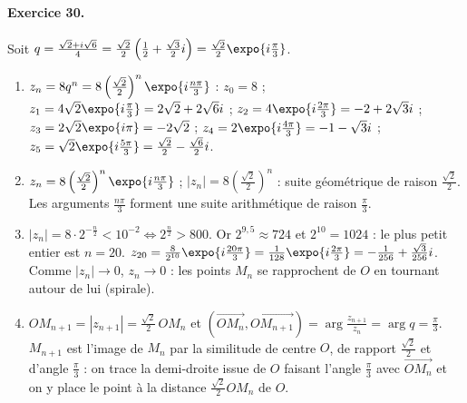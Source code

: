 \begin{corrige}
\paragraph{Exercice 30.}
Soit $q = \frac{\sqrt{2} + i\sqrt{6}}{4} = \frac{\sqrt{2}}{2}\left(\frac{1}{2} + \frac{\sqrt{3}}{2}i\right) = \frac{\sqrt{2}}{2}\expo{i\frac{\pi}{3}}$.
\begin{enumerate}
\item $z_n = 8q^n = 8\left(\frac{\sqrt{2}}{2}\right)^n\expo{i\frac{n\pi}{3}}$ :
      $z_0 = 8$ ; $z_1 = 4\sqrt{2}\expo{i\frac{\pi}{3}} = 2\sqrt{2} + 2\sqrt{6}i$ ; $z_2 = 4\expo{i\frac{2\pi}{3}} = -2 + 2\sqrt{3}i$ ;
      $z_3 = 2\sqrt{2}\expo{i\pi} = -2\sqrt{2}$ ; $z_4 = 2\expo{i\frac{4\pi}{3}} = -1 - \sqrt{3}i$ ; $z_5 = \sqrt{2}\expo{i\frac{5\pi}{3}} = \frac{\sqrt{2}}{2} - \frac{\sqrt{6}}{2}i$.
\item $z_n = 8\left(\frac{\sqrt{2}}{2}\right)^n\expo{i\frac{n\pi}{3}}$ ; $|z_n| = 8\left(\frac{\sqrt{2}}{2}\right)^n$ : suite g\'eom\'etrique de raison $\frac{\sqrt{2}}{2}$.
      Les arguments $\frac{n\pi}{3}$ forment une suite arithm\'etique de raison $\frac{\pi}{3}$.
\item $|z_n| = 8\cdot 2^{-\frac{n}{2}} < 10^{-2} \iff 2^{\frac{n}{2}} > 800$. Or $2^{9{,}5} \approx 724$ et $2^{10} = 1024$ : le plus petit entier est $\boxed{n = 20}$.
      $z_{20} = \frac{8}{2^{10}}\expo{i\frac{20\pi}{3}} = \frac{1}{128}\expo{i\frac{2\pi}{3}} = -\frac{1}{256} + \frac{\sqrt{3}}{256}i$.
      Comme $|z_n| \to 0$, $z_n \to 0$ : les points $M_n$ se rapprochent de $O$ en tournant autour de lui (spirale).
\item $OM_{n+1} = |z_{n+1}| = \frac{\sqrt{2}}{2}\,OM_n$ et $\left(\overrightarrow{OM_n},\overrightarrow{OM_{n+1}}\right) = \arg\frac{z_{n+1}}{z_n} = \arg q = \frac{\pi}{3}$.
      $M_{n+1}$ est l'image de $M_n$ par la similitude de centre $O$, de rapport $\frac{\sqrt{2}}{2}$ et d'angle $\frac{\pi}{3}$ :
      on trace la demi-droite issue de $O$ faisant l'angle $\frac{\pi}{3}$ avec $\overrightarrow{OM_n}$ et on y place le point \`a la distance $\frac{\sqrt{2}}{2}OM_n$ de $O$.
\end{enumerate}


\end{corrige}
